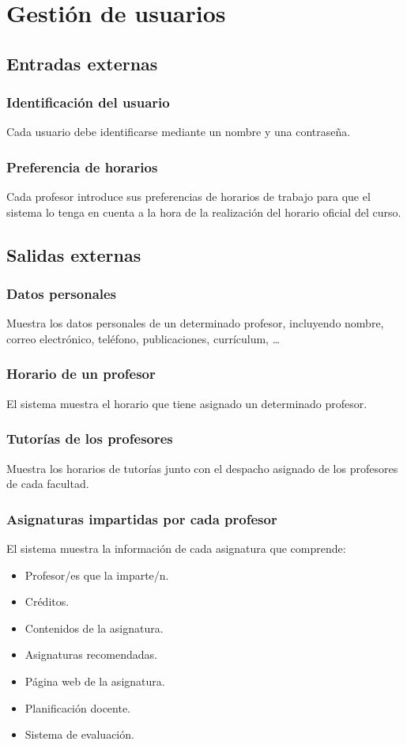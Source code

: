 \documentclass[11pt,a4paper,spanish,twoside]{book}
\begin{document}
\section{Gestión de usuarios}
\subsection{Entradas externas}
\subsubsection{Identificación del usuario}
Cada usuario debe identificarse mediante un nombre y una contraseña.

\subsubsection{Preferencia de horarios} 
Cada profesor introduce sus preferencias de horarios de trabajo para que el
sistema lo tenga en cuenta a la hora de la realización del horario oficial
del curso.

\subsection{Salidas externas}
\subsubsection{Datos personales}
Muestra los datos personales de un determinado profesor, incluyendo
nombre, correo electrónico, teléfono, publicaciones, currículum, \dots

\subsubsection{Horario de un profesor}
El sistema muestra el horario que tiene asignado un determinado profesor.

\subsubsection{Tutorías de los profesores} 
Muestra los horarios de tutorías junto con el despacho asignado de los
profesores de cada facultad.
 
\subsubsection{Asignaturas impartidas por cada profesor}
El sistema muestra la información de cada asignatura que comprende:
\begin{itemize}
\item Profesor/es que la imparte/n.
\item Créditos.
\item Contenidos de la asignatura.
\item Asignaturas recomendadas.
\item Página web de la asignatura.
\item Planificación docente.
\item Sistema de evaluación.
\end{itemize}
\end{document}
